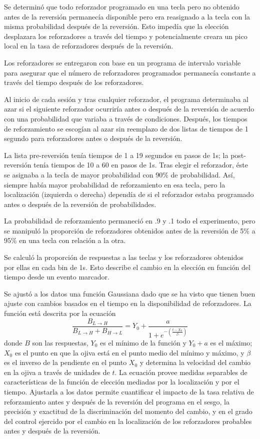 \documentclass[a4paper,12pt]{article}
\begin{document}
Se determinó que todo reforzador programado en una tecla pero no obtenido antes de la reversión permanecía disponible pero era reasignado a la tecla con la misma probabilidad después de la reversión.
Esto impedía que la elección desplazara los reforzadores a través del tiempo y potencialmente creara un pico local en la tasa de reforzadores después de la reversión.

Los reforzadores se entregaron con base en un programa de intervalo variable para asegurar que el número de reforzadores programados permanecía constante a través del tiempo después de los reforzadores.

Al inicio de cada sesión y tras cualquier reforzador, el programa determinaba al azar si el siguiente reforzador ocurriría antes o después de la reversión de acuerdo con una probabilidad que variaba a través de condiciones.
Después, los tiempos de reforzamiento se escogían al azar sin reemplazo de dos listas de tiempos de 1 segundo para reforzadores antes o después de la reversión.

La lista pre-reversión tenía tiempos de 1 a 19 segundos en pasos de 1s; la post-reversión tenía tiempos de 10 a 60 en pasos de 1s.
Tras elegir el reforzador, éste se asignaba a la tecla de mayor probabilidad con 90\% de probabilidad.
Así, siempre había mayor probabilidad de reforzamiento en esa tecla, pero la localización (izquierda o derecha) dependía de si el reforzador estaba programado antes o después de la reversión de probabilidades.

La probabilidad de reforzamiento permaneció en .9 y .1 todo el experimento, pero se manipuló la proporción de reforzadores obtenidos antes de la reversión de 5\% a 95\% en una tecla con relación a la otra.

Se calculó la proporción de respuestas a las teclas y los reforzadores obtenidos por ellas en cada bin de 1s.
Esto describe el cambio en la elección en función del tiempo desde un evento marcador.

Se ajustó a los datos una función Gaussiana dado que se ha visto que tienen buen ajuste con cambios basados en el tiempo en la disponibilidad de reforzadores.
La función está descrita por la ecuación
\[
\frac{
    B_{L\rightarrow H}
}{
    B_{L \rightarrow H} + B_{H \rightarrow L}
} = Y_0 + \frac{
    a
}{
    1 + e^{-\left(\frac{t - X_0}{\beta}\right)}
}
\]
donde $B$ son las respuestas, $Y_0$ es el mínimo de la función y $Y_0 + a$ es el máximo; $X_0$ es el punto en que la ojiva está en el punto medio del mínimo y máximo, y $\beta$ es el inverso de la pendiente en el punto $X_0$ y determina la velocidad del cambio en la ojiva a través de unidades de $t$.
La ecuación provee medidas separables de características de la función de elección mediadas por la localización y por el tiempo.
Ajustarla a los datos permite cuantificar el impacto de la tasa relativa de reforzamiento antes y después de la reversión del programa en el sesgo, la precisión y exactitud de la discriminación del momento del cambio, y en el grado del control ejercido por el cambio en la localización de los reforzadores probables antes y después de la reversión.
\end{document}
